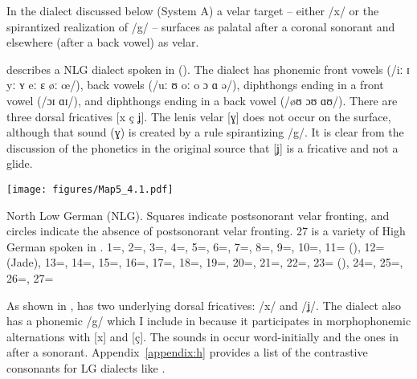 In the dialect discussed below (System A) a velar target -- either /x/ or the spirantized realization of /g/ -- surfaces as palatal after a coronal sonorant and elsewhere (after a back vowel) as velar.

\citet{Larsson1917} describes a NLG dialect spoken in  (). The dialect has phonemic front vowels (/iː ɪ yː ʏ eː ɛ øː œ/), back vowels (/uː ʊ oː o ɔ ɑ ə/), diphthongs ending in a front vowel (/ɔɪ ɑɪ/), and diphthongs ending in a back vowel (/øʊ ɔʊ ɑʊ/). There are three dorsal fricatives [x ç ʝ]. The lenis velar [ɣ] does not occur on the surface, although that sound ({\textbar}ɣ{\textbar}) is created by a rule spirantizing /g/. It is clear from the discussion of the phonetics in the original source \citep[11--12]{Larsson1917} that [ʝ] is a fricative and not a glide.

\begin{map}
\texttt{[image: figures/Map5\_4.1.pdf]}
  \caption[North Low German]{North Low German (NLG). Squares indicate postsonorant velar fronting, and circles indicate the absence of postsonorant velar fronting. 27 is a variety of High German spoken in . 1=\citet{Hobbing1879}, 2=\citet{Kohbrok1901}, 3=\citet{vorMohr1904}, 4=\citet{Schönhoff1908}, 5=\citet{Vehslage1908}, 6=\citet{Rabeler1911}, 7=\citet{Kloeke1914}, 8=\citet{Stammerjochen1914}, 9=\citet{Sievers1914}, 10=\citet{Larsson1917}, 11=\citet{Götze1922} (), 12=\citet{Götze1922} (Jade), 13=\citet{Jörgensen1928}, 14=\citet{Heigener1937}, 15=\citet{Schmeding1937}, 16=\citet{Feyer1939}, 17=\citet{Feyer1941}, 18=\citet{Bollmann1942}, 19=\citet{Schmidt-Brockhoff1943}, 20=\citet{Pühn1956}, 21=\citet{vonEssen1958}, 22=\citet{Keller1961}, 23=\citet{BethgeBonnin1969} (), 24=\citet{Mews1971}, 25=\citet{Willkommen1999}, 26=\citet{Höder2010}, 27=\citet{Glover2011, Glover2014}}
  \label{fig:4.1}\label{map:5}
\end{map}

As shown in ,  has two underlying dorsal fricatives: /x/ and /ʝ/. The dialect also has a phonemic /g/ which I include in  because it participates in morphophonemic alternations with [x] and [ç]. The sounds in  occur word-initially and the ones in  after a sonorant. Appendix~\ref{appendix:h} provides a list of the contrastive consonants for LG dialects like .

